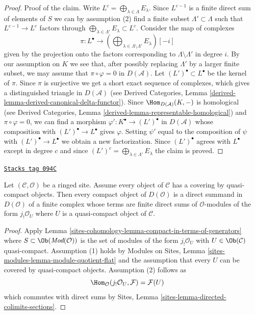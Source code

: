 \begin{proof}
\medskip\noindent
Proof of the claim. Write $L^c = \bigoplus_{\lambda \in \Lambda} E_\lambda$.
Since $L^{c - 1}$ is a finite direct sum of elements of $S$
we can by assumption (2) find a finite subset
$\Lambda' \subset \Lambda$ such that $L^{c - 1} \to L^c$ factors
through $\bigoplus_{\lambda \in \Lambda'} E_\lambda \subset L^c$.
Consider the map of complexes
$$
\pi :
L^\bullet
\longrightarrow
(\bigoplus\nolimits_{\lambda \in \Lambda \setminus \Lambda'} E_\lambda)[-i]
$$
given by the projection onto the factors corresponding to
$\Lambda \setminus \Lambda'$ in degree $i$.
By our assumption on $K$ we see that, after possibly replacing $\Lambda'$ by
a larger finite subset, we may assume that $\pi \circ \varphi = 0$
in $D(\mathcal{A})$.
Let $(L')^\bullet \subset L^\bullet$ be the kernel of $\pi$.
Since $\pi$ is surjective we get a short exact sequence of complexes,
which gives a distinguished triangle in $D(\mathcal{A})$ (see
Derived Categories, Lemma \ref{derived-lemma-derived-canonical-delta-functor}).
Since $\Hom_{D(\mathcal{A})}(K, -)$ is homological (see
Derived Categories, Lemma \ref{derived-lemma-representable-homological})
and $\pi \circ \varphi = 0$, we can find a morphism
$\varphi' : K^\bullet \to (L')^\bullet$ in $D(\mathcal{A})$ whose
composition with $(L')^\bullet \to L^\bullet$ gives $\varphi$.
Setting $\psi'$ equal to the composition of $\psi$ with
$(L')^\bullet \to L^\bullet$ we obtain a new factorization.
Since $(L')^\bullet$ agrees with $L^\bullet$ except in degree $c$
and since $(L')^c = \bigoplus_{\lambda \in \Lambda'} E_\lambda$ the
claim is proved.
\end{proof}

\begin{lemma}
\label{sites-cohomology-lemma-compact-objects-if-enough-qc}
\href{https://stacks.math.columbia.edu/tag/094C}{\texttt{Stacks tag 094C}}

Let $(\mathcal{C}, \mathcal{O})$ be a ringed site. Assume every object of
$\mathcal{C}$ has a covering by quasi-compact objects. Then every
compact object of $D(\mathcal{O})$ is a direct summand in $D(\mathcal{O})$
of a finite complex whose terms are finite direct sums of
$\mathcal{O}$-modules of the form $j_!\mathcal{O}_U$
where $U$ is a quasi-compact object of $\mathcal{C}$.
\end{lemma}

\begin{proof}
Apply Lemma \ref{sites-cohomology-lemma-compact-in-terms-of-generators}
where $S \subset \Ob(\textit{Mod}(\mathcal{O}))$ is the set of modules
of the form $j_!\mathcal{O}_U$ with $U \in \Ob(\mathcal{C})$
quasi-compact. Assumption (1) holds by
Modules on Sites, Lemma \ref{sites-modules-lemma-module-quotient-flat}
and the assumption that every $U$ can be covered by quasi-compact
objects. Assumption (2) follows as
$$
\Hom_\mathcal{O}(j_!\mathcal{O}_U, \mathcal{F}) = \mathcal{F}(U)
$$
which commutes with direct sums by
Sites, Lemma \ref{sites-lemma-directed-colimits-sections}.
\end{proof}

